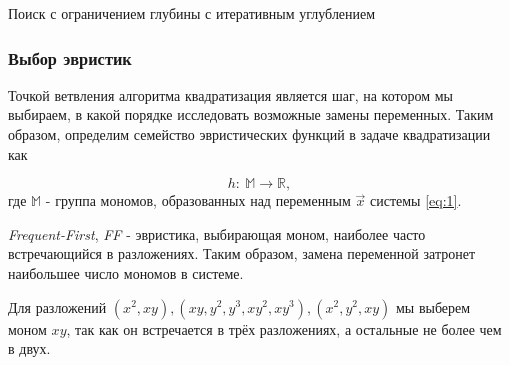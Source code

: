 \begin{algorithm}[H]
\SetAlgoLined
{}

\caption{Поиск с ограничением глубины с итеративным углублением}
\label{algo:ID-DLS}
\end{algorithm}



\subsubsection{Выбор эвристик} \label{heuristics}

Точкой ветвления алгоритма квадратизация является шаг, на котором мы выбираем, в какой порядке исследовать возможные замены переменных. Таким образом, определим семейство эвристических функций в задаче квадратизации как 

\begin{equation}
    h:\ \mathbb{M} \longrightarrow \mathbb{R},
\end{equation}
где $\mathbb{M}$ - группа мономов, образованных над переменным $\vec x$ системы \ref{eq:1}. 

\begin{heuristics} \label{FF}
    \textit{Frequent-First}, \textit{FF} - эвристика, выбирающая моном, наиболее часто встречающийся в разложениях. Таким образом, замена переменной затронет наибольшее число мономов в системе.
    
    \begin{example}
        Для разложений $(x^2, xy), (xy, y^2, y^3, xy^2, xy^3), (x^2, y^2, xy)$ мы выберем моном $xy$, так как он встречается в трёх разложениях, а остальные не более чем в двух.
    \end{example}
\end{heuristics}

